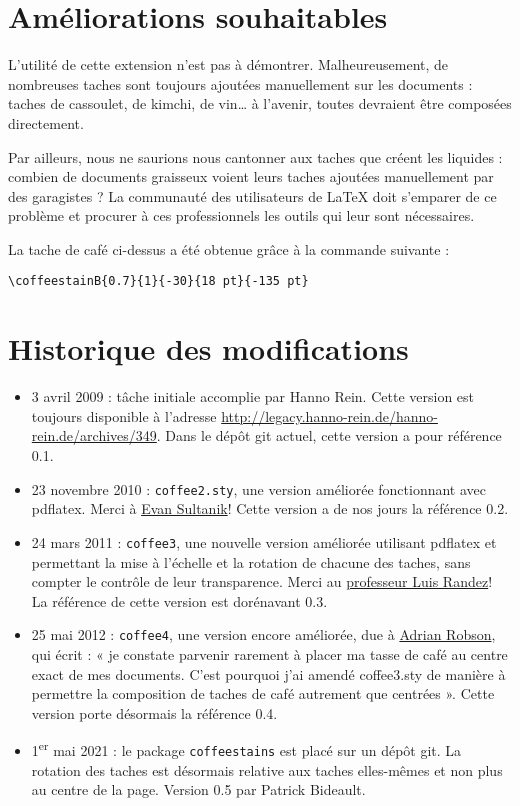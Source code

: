 \documentclass[a4paper, 11pt, BCOR = 0 pt, DIV = 13, oneside, french]{scrartcl}
\begin{document}
\section{Améliorations souhaitables}
L'utilité de cette extension n'est pas à démontrer. Malheureusement, de
nombreuses taches sont toujours ajoutées manuellement sur les documents : taches
de cassoulet, de kimchi, de vin\dots{} à l'avenir, toutes devraient être composées directement.

Par ailleurs, nous ne saurions nous cantonner aux taches que créent les
liquides : combien de documents graisseux voient leurs taches ajoutées
manuellement par des garagistes ? La communauté des utilisateurs de \LaTeX{}
doit s'emparer de ce problème et procurer à ces professionnels les outils qui leur
sont nécessaires.

\vfill{}

\begin{tcolorbox}
  La tache de café ci-dessus a été obtenue grâce à la commande suivante :

  \verb|\coffeestainB{0.7}{1}{-30}{18 pt}{-135 pt}|
\end{tcolorbox}
\newpage{}
\section{Historique des modifications}
\begin{itemize}
\item 3 avril 2009 : tâche initiale accomplie par Hanno Rein. Cette version est
  toujours disponible à l'adresse
  \url{http://legacy.hanno-rein.de/hanno-rein.de/archives/349}. Dans le dépôt
  git actuel, cette version a pour référence 0.1.
\item 23 novembre 2010 : \texttt{coffee2.sty}, une version améliorée fonctionnant
  avec pdflatex. Merci à \href{http://www.sultanik.com/}{Evan Sultanik}! Cette
  version a de nos jours la référence 0.2.
\item 24 mars 2011 : \texttt{coffee3}, une nouvelle version améliorée utilisant
  pdflatex et permettant la mise à l'échelle et la rotation de chacune des
  taches, sans compter le contrôle de leur transparence. Merci au \href{http://pcmap.unizar.es/~pilar/}{professeur Luis
    Randez}! La référence de cette version est dorénavant 0.3.
\item 25 mai 2012 : \texttt{coffee4}, une version encore améliorée, due à
  \href{http://nepsweb.co.uk/homeapr/}{Adrian Robson}, qui écrit : « je constate
  parvenir rarement à placer ma tasse de café au centre exact de mes documents.
  C'est pourquoi j'ai amendé coffee3.sty de manière à permettre la composition
  de taches de café autrement que centrées ». Cette
  version porte désormais la référence 0.4.
\item 1\textsuperscript{er} mai 2021 : le package \texttt{coffeestains} est
  placé sur un dépôt git. La rotation des taches est désormais relative aux
  taches elles-mêmes et non plus au centre de la page. Version 0.5 par Patrick Bideault.
\end{itemize}
\label{stainC}
\end{document}
